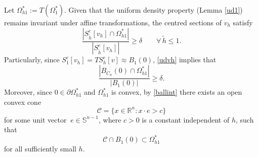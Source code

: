 \documentclass[11pt]{amsart}
\theoremstyle{plain}
\newcommand{\0}{\textbf{0}}
\numberwithin{equation}{section}
\numberwithin{equation}{section}
\numberwithin{figure}{section}
\begin{document}
Let $\Omega_{h1}^* := T(\Omega^*_{1})$. 
Given that the uniform density property (Lemma \ref{ud1}) remains invariant under affine transformations, 
the centred sections of \( v_h \) satisfy
\begin{equation}\label{udvh}
\frac{|S_{\tilde h}^c[v_h] \cap \Omega^*_{h1}|}{|S_{\tilde h}^c[v_h]|} \geq \delta \qquad \forall\, \tilde h \leq 1. 
\end{equation} 
Particularly, since \( S_{1}^c[v_h] = TS^c_h[v] \approx B_1(0) \), \eqref{udvh} implies that
\begin{equation}\label{ballint}
\frac{|B_{C_n}(0) \cap \Omega^*_{h1}|}{|B_1(0)|} \geq \delta.
\end{equation}
Moreover, since $0\in\partial\Omega^*_{h1}$ and $\Omega^*_{h1}$ is convex, by \eqref{ballint} there exists an open convex cone 
	\[ \mathcal{C}=\{x\in\mathbb{R}^n : x\cdot e > c\}\] 
	for some unit vector \(\ e\in\mathbb{S}^{n-1}\),
where $c>0$ is a constant independent of \( h \), such that
\begin{equation}\label{ccin1}
\mathcal{C} \cap B_1(0) \subset \Omega^*_{h1}
\end{equation}
for all sufficiently small \( h \).
\end{document}
